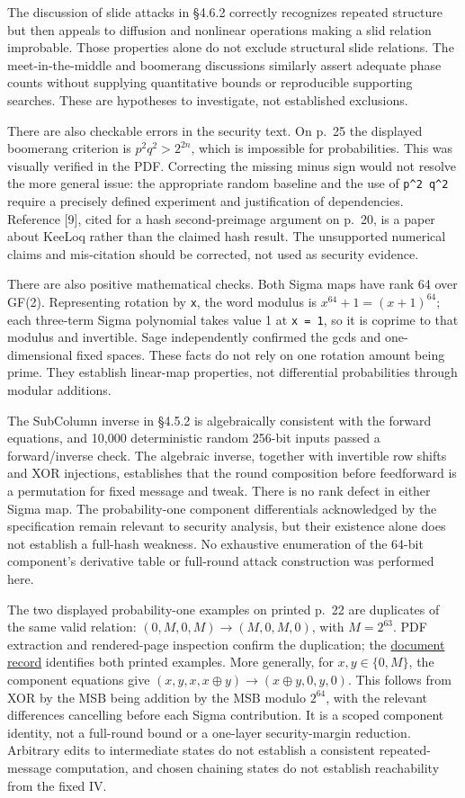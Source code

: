 \documentclass[
  english,
  11pt,
  a4paper,
]{article}
\begin{document}
The discussion of slide attacks in §4.6.2 correctly recognizes repeated
structure but then appeals to diffusion and nonlinear operations making
a slid relation improbable. Those properties alone do not exclude
structural slide relations. The meet-in-the-middle and boomerang
discussions similarly assert adequate phase counts without supplying
quantitative bounds or reproducible supporting searches. These are
hypotheses to investigate, not established exclusions.

There are also checkable errors in the security text. On p.~25 the
displayed boomerang criterion is \(p^2q^2 > 2^{2n}\), which is
impossible for probabilities. This was visually verified in the PDF.
Correcting the missing minus sign would not resolve the more general
issue: the appropriate random baseline and the use of
\texttt{p\^{}2\ q\^{}2} require a precisely defined experiment and
justification of dependencies. Reference {[}9{]}, cited for a hash
second-preimage argument on p.~20, is a paper about KeeLoq rather than
the claimed hash result. The unsupported numerical claims and
mis-citation should be corrected, not used as security evidence.

There are also positive mathematical checks. Both Sigma maps have rank
64 over GF(2). Representing rotation by \texttt{x}, the word modulus is
\(x^{64}+1=(x+1)^{64}\); each three-term Sigma polynomial takes value 1
at \texttt{x\ =\ 1}, so it is coprime to that modulus and invertible.
Sage independently confirmed the gcds and one-dimensional fixed spaces.
These facts do not rely on one rotation amount being prime. They
establish linear-map properties, not differential probabilities through
modular additions.

The SubColumn inverse in §4.5.2 is algebraically consistent with the
forward equations, and 10,000 deterministic random 256-bit inputs passed
a forward/inverse check. The algebraic inverse, together with invertible
row shifts and XOR injections, establishes that the round composition
before feedforward is a permutation for fixed message and tweak. There
is no rank defect in either Sigma map. The probability-one component
differentials acknowledged by the specification remain relevant to
security analysis, but their existence alone does not establish a
full-hash weakness. No exhaustive enumeration of the 64-bit component's
derivative table or full-round attack construction was performed here.

The two displayed probability-one examples on printed p.~22 are
duplicates of the same valid relation: \((0,M,0,M)\to(M,0,M,0)\), with
\(M=2^{63}\). PDF extraction and rendered-page inspection confirm the
duplication; the \href{evidence/specification_examples.json}{document
record} identifies both printed examples. More generally, for
\(x,y\in\{0,M\}\), the component equations give
\((x,y,x,x\oplus y)\to(x\oplus y,0,y,0)\). This follows from XOR by the
MSB being addition by the MSB modulo \(2^{64}\), with the relevant
differences cancelling before each Sigma contribution. It is a scoped
component identity, not a full-round bound or a one-layer
security-margin reduction. Arbitrary edits to intermediate states do not
establish a consistent repeated-message computation, and chosen chaining
states do not establish reachability from the fixed IV.
\end{document}
